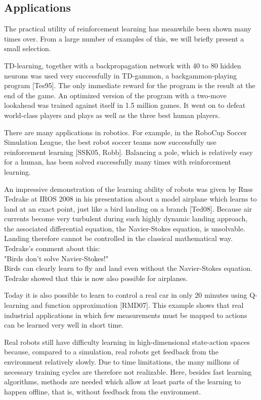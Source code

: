 \documentclass[10pt]{article}
\begin{document}
\subsection*{Applications}
The practical utility of reinforcement learning has meanwhile been shown many times over. From a large number of examples of this, we will briefly present a small selection.

TD-learning, together with a backpropagation network with 40 to 80 hidden neurons was used very successfully in TD-gammon, a backgammon-playing program [Tes95]. The only immediate reward for the program is the result at the end of the game. An optimized version of the program with a two-move lookahead was trained against itself in 1.5 million games. It went on to defeat world-class players and plays as well as the three best human players.

There are many applications in robotics. For example, in the RoboCup Soccer Simulation League, the best robot soccer teams now successfully use reinforcement learning [SSK05, Robb]. Balancing a pole, which is relatively easy for a human, has been solved successfully many times with reinforcement learning.

An impressive demonstration of the learning ability of robots was given by Russ Tedrake at IROS 2008 in his presentation about a model airplane which learns to land at an exact point, just like a bird landing on a branch [Ted08]. Because air currents become very turbulent during such highly dynamic landing approach, the associated differential equation, the Navier-Stokes equation, is unsolvable. Landing therefore cannot be controlled in the classical mathematical way. Tedrake's comment about this:\\
"Birds don't solve Navier-Stokes!"\\
Birds can clearly learn to fly and land even without the Navier-Stokes equation. Tedrake showed that this is now also possible for airplanes.

Today it is also possible to learn to control a real car in only 20 minutes using Q-learning and function approximation [RMD07]. This example shows that real industrial applications in which few measurements must be mapped to actions can be learned very well in short time.

Real robots still have difficulty learning in high-dimensional state-action spaces because, compared to a simulation, real robots get feedback from the environment relatively slowly. Due to time limitations, the many millions of necessary training cycles are therefore not realizable. Here, besides fast learning algorithms, methods are needed which allow at least parts of the learning to happen offline, that is, without feedback from the environment.
\end{document}
